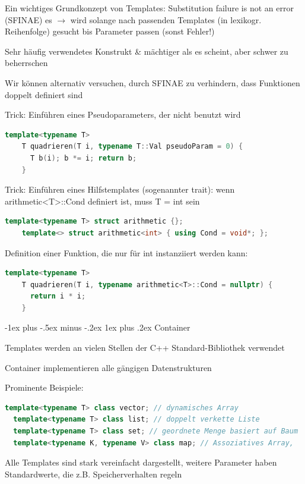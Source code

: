 \documentclass[10pt]{article}
\makeatletter
\renewcommand{\subsubsection}{\@startsection{subsubsection}{3}{0mm}%
                                {-1ex plus -.5ex minus -.2ex}%
                                {1ex plus .2ex}%
                                {\normalfont\small\bfseries}}
\makeatother
\begin{document}
\begin{itemize*}
  \item Ein wichtiges Grundkonzept von Templates: Substitution failure is not an error (SFINAE) es $\rightarrow$ wird solange nach passenden Templates (in lexikogr. Reihenfolge) gesucht bis Parameter passen (sonst Fehler!)
  \item Sehr häufig verwendetes Konstrukt \& mächtiger als es scheint, aber schwer zu beherrschen
  \begin{itemize*}
    \item Wir können alternativ versuchen, durch SFINAE zu verhindern, dass Funktionen doppelt definiert sind
    \item Trick: Einführen eines Pseudoparameters, der nicht benutzt wird
    \begin{lstlisting}[language=C++]
    template<typename T>
    T quadrieren(T i, typename T::Val pseudoParam = 0) {
      T b(i); b *= i; return b;
    }
    \end{lstlisting}
    \item Trick: Einführen eines Hilfstemplates (sogenannter trait): wenn arithmetic<T>::Cond definiert ist, muss T = int sein
    \begin{lstlisting}[language=C++]
    template<typename T> struct arithmetic {};
    template<> struct arithmetic<int> { using Cond = void*; };
    \end{lstlisting}
    \item Definition einer Funktion, die nur für int instanziiert werden kann:
    \begin{lstlisting}[language=C++]
    template<typename T>
    T quadrieren(T i, typename arithmetic<T>::Cond = nullptr) {
      return i * i;
    }
    \end{lstlisting}
  \end{itemize*}
\end{itemize*}

\subsubsection{Container}
\begin{itemize*}
  \item Templates werden an vielen Stellen der C++ Standard-Bibliothek verwendet
  \item Container implementieren alle gängigen Datenstrukturen
  \item Prominente Beispiele:
  \begin{lstlisting}[language=C++]
  template<typename T> class vector; // dynamisches Array
  template<typename T> class list; // doppelt verkette Liste
  template<typename T> class set; // geordnete Menge basiert auf Baum
  template<typename K, typename V> class map; // Assoziatives Array,
  \end{lstlisting}
  \item Alle Templates sind stark vereinfacht dargestellt, weitere Parameter haben Standardwerte, die z.B. Speicherverhalten regeln
\end{itemize*}
\end{document}

